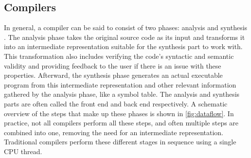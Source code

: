 \documentclass[11pt,dvipsnames]{article}
\begin{document}
\subsection{Compilers}
In general, a compiler can be said to consist of two phases: analysis and synthesis \cite{compilerbook}. The analysis phase takes the original source code as its input and transforms it into an intermediate representation suitable for the synthesis part to work with. This transformation also includes verifying the code's syntactic and semantic validity and providing feedback to the user if there is an issue with these properties. Afterward, the synthesis phase generates an actual executable program from this intermediate representation and other relevant information gathered by the analysis phase, like a symbol table. The analysis and synthesis parts are often called the front end and back end respectively. A schematic overview of the steps that make up these phases is shown in \autoref{fig:dataflow}. In practice, not all compilers perform all these steps, and often multiple steps are combined into one, removing the need for an intermediate representation. Traditional compilers perform these different stages in sequence using a single CPU thread.
\end{document}
